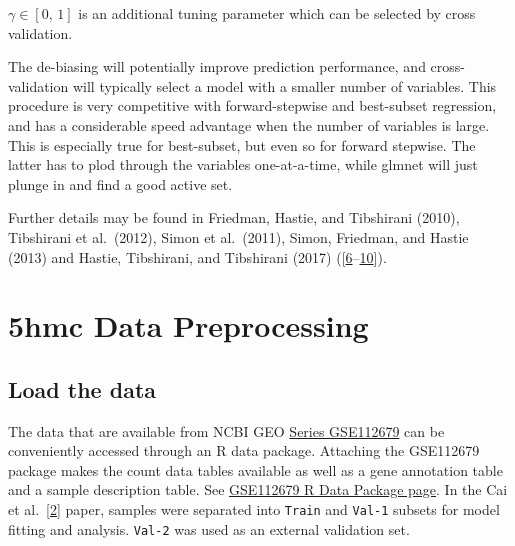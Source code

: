 \documentclass[
]{book}
\begin{document}
\(\gamma \in [0,\, 1]\) is an additional tuning parameter which can be selected by cross validation.

The de-biasing will potentially improve prediction performance, and
cross-validation will typically select a model with a smaller number of variables.
This procedure is very competitive with forward-stepwise and
best-subset regression, and has a considerable speed advantage when the
number of variables is large. This is especially true for best-subset,
but even so for forward stepwise. The latter has to plod through the
variables one-at-a-time, while glmnet will just plunge in and find a good active set.

Further details may be found in
Friedman, Hastie, and Tibshirani (2010),
Tibshirani et al.~(2012),
Simon et al.~(2011),
Simon, Friedman, and Hastie (2013) and
Hastie, Tibshirani, and Tibshirani (2017)
({[}\protect\hyperlink{ref-Friedman:2010aa}{6}--\protect\hyperlink{ref-Simon:2013aa}{10}{]}).

\hypertarget{preproc}{%
\chapter{5hmc Data Preprocessing}\label{preproc}}

\hypertarget{load-the-data}{%
\section{Load the data}\label{load-the-data}}

The data that are available from NCBI GEO
\href{https://www.ncbi.nlm.nih.gov/geo/query/acc.cgi?acc=GSE112679}{Series GSE112679}
can be conveniently accessed through an R data package.
Attaching the GSE112679 package makes the count data tables
available as well as a gene annotation table and a sample description table.
See \href{https://12379monty.github.io/GSE112679/}{GSE112679 R Data Package page}.
In the Cai et al.~{[}\protect\hyperlink{ref-Cai:2019aa}{2}{]} paper, samples were separated into
\texttt{Train} and \texttt{Val-1} subsets for model fitting and analysis.
\texttt{Val-2} was used as an external validation set.
\end{document}

